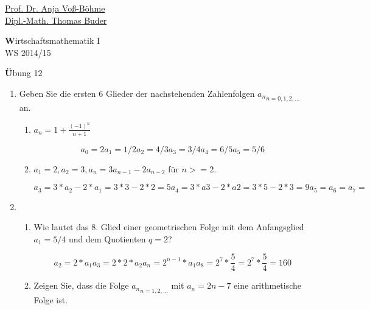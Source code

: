 \documentclass[12pt,a4paper]{scrreprt}
\newcommand{\N}{\mathds{N}}
\begin{document}
 
\begin{flushleft}
\href{mailto:anja.voss-boehme@htw-dresden.de}{Prof. Dr. Anja Voß-Böhme} \\
\href{mailto:buder@htw-dresden.de}{Dipl.-Math. Thomas Buder}
\end{flushleft}

\begin{center}{\large\textbf Wirtschaftsmathematik I} \\ WS 2014/15 \end{center}

\begin{center}{\large\textbf Übung 12 } 
\end{center}


\bigskip

\begin{enumerate}

\item Geben Sie die ersten 6 Glieder der nachstehenden Zahlenfolgen ${a_n }_{n=0,1,2,\ldots} $
an.

\begin{enumerate}

\item $a_n = 1 + \frac{(-1)^n}{n+1}$

\[
a_0 = 2
a_1 = 1/2
a_2 = 4/3
a_3 = 3/4
a_4 = 6/5
a_5 = 5/6
\]

\item $a_1=2, a_2=3, a_n=3a_{n-1}-2a_{n-2}$ für $n>=2$.

\[
a_3 = 3*a_2-2*a_1 = 3*3 - 2*2 = 5
a_4 = 3*a3 - 2*a2 = 3*5 - 2*3 = 9
a_5 = 
a_6 = 
a_7 = 
\]

\end{enumerate}

\item  \begin{enumerate}

Geometr. Folge: Hier ist der Nachfolger ein Vielfaches des Vorgängers.

\[
{a_{n+1}}{a_n} = c, c konst. f. alle n \in \N
\]

\item Wie lautet das 8. Glied einer geometrischen Folge mit dem Anfangsglied
$a_1 = 5/4$ und dem Quotienten $q = 2$?

\[
a_2 = 2*a_1
a_3 = 2*2*a_2
a_n = 2^{n-1}*a_1
a_8 = 2^7*\frac{5}{4}=2^7*\frac{5}{4}=160
\]

\item Zeigen Sie, dass die Folge ${a_n}_{n=1,2,\ldots}$ mit $a_n = 2n − 7$ eine arithmetische
Folge ist.


\end{enumerate}
\end{enumerate}
\end{document}
